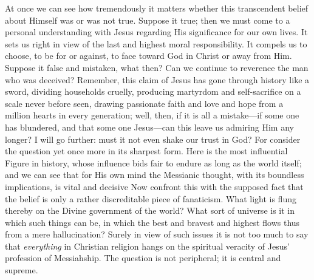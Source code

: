 \documentclass[12pt,a5paper,oneside]{book}
\begin{document}
At once we can see how tremendously it
matters whether this transcendent belief about
Himself was or was not true. Suppose it true;
then we must come to a personal understanding
with Jesus regarding His significance for our
own lives. It sets us right in view of the last
and highest moral responsibility. It compels us
to choose, to be for or against, to face toward
God in Christ or away from Him. Suppose it
false and mistaken, what then? Can we continue 
to reverence the man who was deceived?
Remember, this claim of Jesus has gone through
history like a sword, dividing households cruelly,
producing martyrdom and self-sacrifice on a
scale never before seen, drawing passionate faith
and love and hope from a million hearts in
every generation; well, then, if it is all a
mistake---if some one has blundered, and that
some one Jesus---can this leave us admiring
Him any longer? I will go further: must it
not even shake our trust in God? For consider 
the question yet once more in its sharpest
form. Here is the most influential Figure in
history, whose influence bids fair to endure as
long as the world itself; and we can see that for
His own mind the Messianic thought, with its
boundless implications, is vital and decisive
Now confront this with the supposed fact that
the belief is only a rather discreditable piece of
fanaticism. What light is flung thereby on the
Divine government of the world? What sort
of universe is it in which such things can be,
in which the best and bravest and highest flows
thus from a mere hallucination? Surely in view
of such issues it is not too much to say that
\textit{everything} in Christian religion hangs on the
spiritual veracity of Jesus' profession of Messiahship.
The question is not peripheral; it is
central and supreme.
\end{document}
